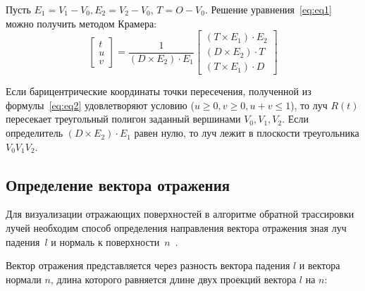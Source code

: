 Пусть $E_1 = V_1 - V_0, E_2 = V_2 - V_0$, $T=O - V_0$. Решение уравнения~\ref{eq:eq1} можно получить методом Крамера:
\begin{equation}\label{eq:eq2}
	\begin{bmatrix}
		t\\
		u\\
		v
	\end{bmatrix} = \frac{1}{(D\times E_2) \cdot E_1}
	\begin{bmatrix}
		(T\times E_1) \cdot E_2\\
		(D\times E_2) \cdot T\\
		(T\times E_1) \cdot D
	\end{bmatrix}
\end{equation}
 
Если барицентрические координаты точки пересечения, полученной из формулы~\ref{eq:eq2} удовлетворяют условию ($u \geq 0, v \geq 0, u + v \leq 1$), то луч $R(t)$ пересекает треугольный полигон заданный вершинами $V_0, V_1, V_2$. Если определитель $(D\times E_2) \cdot E_1$ равен нулю, то луч лежит в плоскости треугольника $V_0V_1V_2$.


%

\subsection{Определение вектора отражения}

Для визуализации отражающих поверхностей в алгоритме обратной трассировки лучей необходим способ определения направления вектора отражения зная луч падения~$l$ и нормаль к поверхности~$n$~\cite{rtOneWeekend}.


Вектор отражения представляется через разность вектора падения $l$ и вектора нормали $n$, длина которого равняется длине двух проекций вектора $l$ на $n$:

